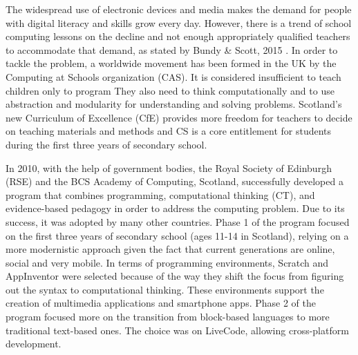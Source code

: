 The widespread use of electronic devices and media makes the demand for people with digital literacy and skills grow every day. However, there is a trend of school computing lessons on the decline and not enough appropriately qualified teachers to accommodate that demand, as stated by Bundy \& Scott, 2015 \cite{CompThinking}.
In order to tackle the problem, a worldwide movement has been formed in the UK by the Computing at Schools organization (CAS)\cite{CAS}.  It is considered insufficient to teach children only to program They also need to think computationally and to use abstraction and modularity for understanding and solving problems. Scotland's new Curriculum of Excellence (CfE) provides more freedom for teachers to decide on teaching materials and methods and CS is a core entitlement for  students during the first three years of secondary school.

In 2010, with the help of government bodies, the Royal Society of Edinburgh
(RSE) and the BCS Academy of Computing, Scotland, successfully developed a program that combines programming, computational thinking (CT), and evidence-based pedagogy in order to address the computing problem. Due to its success, it was adopted by many other countries. Phase 1 of the program focused on the first three years of secondary school (ages 11-14 in Scotland), relying on a more modernistic approach given the fact that current generations are online, social and very mobile. In terms of programming environments, Scratch and AppInventor were selected because of the way they shift the focus from figuring out the syntax to computational thinking. These environments support the creation of multimedia applications and smartphone apps. Phase 2 of the program focused more on the transition from block-based languages to more traditional text-based ones. The choice was on LiveCode, allowing cross-platform development.




